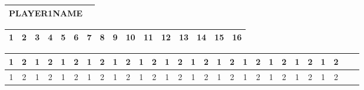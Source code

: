 \documentclass[36pt]{scrartcl}
\begin{document}
\renewcommand\arraystretch{1.25}
\renewcommand\tabcolsep{6pt}

\begin{table}

\begin{tabular}{|p{15cm}!{\vrule width 3pt}p{2cm}!{\vrule width 3pt}}
\hline
\bfseries PLAYER1NAME & \\
\hline
\end{tabular}

\begin{tabular}{|c|c|c|c|c|c!{\vrule width 2pt}c|c|c|c|c|c|c|c|c|c|}
\hline
\bfseries \large 1 & \bfseries \large 2 & \bfseries \large 3 & \bfseries \large 4 & \bfseries \large 5 & \bfseries \large 6 & \bfseries \large 7 & \bfseries \large 8 & \bfseries \large 9 & \bfseries \large 10 & \bfseries \large 11 & \bfseries \large 12 & \bfseries \large 13 & \bfseries \large 14 & \bfseries \large 15 & \bfseries \large 16 \\
\hline
\end{tabular}

\begin{tabular}{|c|c!{\vrule width 2pt}c|c!{\vrule width 2pt}c|c!{\vrule width 2pt}c|c!{\vrule width 2pt}c|c!{\vrule width 2pt}c|c!{\vrule width 2pt}c|c!{\vrule width 2pt}c|c!{\vrule width 2pt}c|c!{\vrule width 2pt}c|c!{\vrule width 2pt}c|c!{\vrule width 2pt}c|c!{\vrule width 2pt}c|c!{\vrule width 2pt}c|c!{\vrule width 2pt}}


\hline
\footnotesize 1 & \footnotesize 2 & \footnotesize 1 & \footnotesize 2 & \footnotesize 1 & \footnotesize 2 & \footnotesize 1 & \footnotesize 2 & \footnotesize 1 & \footnotesize 2 & \footnotesize 1 & \footnotesize 2 & \footnotesize 1 & \footnotesize 2 & \footnotesize 1 & \footnotesize 2 & \footnotesize 1 & \footnotesize 2 & \footnotesize 1 & \footnotesize 2 & \footnotesize 1 & \footnotesize 2 & \footnotesize 1 & \footnotesize 2 & \footnotesize 1 & \footnotesize 2 \\
\hline

\hline
\footnotesize 1 & \footnotesize 2 & \footnotesize 1 & \footnotesize 2 & \footnotesize 1 & \footnotesize 2 & \footnotesize 1 & \footnotesize 2 & \footnotesize 1 & \footnotesize 2 & \footnotesize 1 & \footnotesize 2 & \footnotesize 1 & \footnotesize 2 & \footnotesize 1 & \footnotesize 2 & \footnotesize 1 & \footnotesize 2 & \footnotesize 1 & \footnotesize 2 & \footnotesize 1 & \footnotesize 2 & \footnotesize 1 & \footnotesize 2 & \footnotesize 1 & \footnotesize 2 \\
\hline


\end{tabular}
\end{table}
\end{document}

